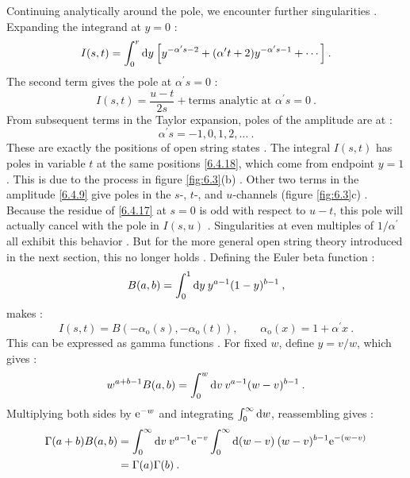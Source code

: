 Continuing analytically around the pole, we encounter further singularities . Expanding the integrand at $y=0$ :
\begin{equation}
	I(s, t)=\int_{0}^{r} \mathrm{d} y\: \Bigl[y^{-\alpha^{\prime} s-2}+ (\alpha^{\prime} t+2) y^{-\alpha^{\prime} s-1}+\cdots\Bigr] \:. \label{6.4.16}
\end{equation}
The second term gives the pole at $\alpha^{\prime} s=0$ :
\begin{equation}
	I(s, t)=\frac{u-t}{2 s}+\text{terms analytic at } \alpha^{\prime} s=0 \:. \label{6.4.17}
\end{equation}
From subsequent terms in the Taylor expansion, poles of the amplitude are at :
\begin{equation}
	\alpha^{\prime} s=-1,0,1,2, \ldots \:. \label{6.4.18}
\end{equation}
These are exactly the positions of open string states . The integral $I(s, t)$ has poles in variable $t$ at the same positions \eqref{6.4.18}, which come from endpoint $y=1$ . This is due to the process in figure \ref{fig:6.3}(b) . Other two terms in the amplitude \eqref{6.4.9} give poles in the $s$-, $t$-, and $u$-channels (figure \ref{fig:6.3}c) . Because the residue of \eqref{6.4.17} at $s=0$ is odd with respect to $u-t$, this pole will actually cancel with the pole in $I(s, u)$ . Singularities at even multiples of $1 / \alpha^{\prime}$ all exhibit this behavior . But for the more general open string theory introduced in the next section, this no longer holds . Defining the Euler beta function :
\begin{equation}
	B(a, b)=\int_{0}^{1} \mathrm{d} y\: y^{a-1}(1-y)^{b-1} \:, \label{6.4.19}
\end{equation}
makes :
\begin{equation}
	I(s, t)=B(-\alpha_{\mathrm{o}}(s),-\alpha_{\mathrm{o}}(t)), \qquad \alpha_{\mathrm{o}}(x)=1+\alpha^{\prime} x \:. 
	\label{6.4.20}
\end{equation}
This can be expressed as gamma functions . For fixed $w$, define $y=v / w$, which gives :
\begin{equation}
	w^{a+b-1} B(a, b)=\int_{0}^{w} \mathrm{d} v \: v^{a-1}(w-v)^{b-1} \:. \label{6.4.21}
\end{equation}
Multiplying both sides by $\mathrm{e}^{-w}$ and integrating $\int_{0}^{\infty} \mathrm{d} w$, reassembling gives :
\begin{align}
	\Gamma(a+b) B(a, b) &=\int_{0}^{\infty} \mathrm{d} v\: v^{a-1} \mathrm{e}^{-v} \int_{0}^{\infty} \mathrm{d}(w-v) \: (w-v)^{b-1} \mathrm{e}^{-(w-v)} \nonumber \\
	&=\Gamma(a) \Gamma(b) \:. \label{6.4.22}
\end{align}
